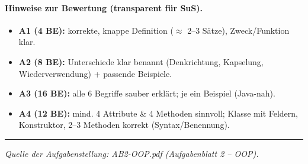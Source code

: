 \documentclass[11pt,a4paper]{scrartcl}
\begin{document}
	\paragraph{Hinweise zur Bewertung (transparent für SuS).}
	\begin{itemize}[leftmargin=*,itemsep=0.2em]
		\item \textbf{A1 (4 BE):} korrekte, knappe Definition (\(\approx\) 2–3 Sätze), Zweck/Funktion klar.
		\item \textbf{A2 (8 BE):} Unterschiede klar benannt (Denkrichtung, Kapselung, Wiederverwendung) + passende Beispiele.
		\item \textbf{A3 (16 BE):} alle 6 Begriffe sauber erklärt; je ein Beispiel (Java-nah).
		\item \textbf{A4 (12 BE):} mind. 4 Attribute \& 4 Methoden sinnvoll; Klasse mit Feldern, Konstruktor, 2–3 Methoden korrekt (Syntax/Benennung).
	\end{itemize}
	
	\vfill
	\hrule
	\small\emph{Quelle der Aufgabenstellung: AB2-OOP.pdf (Aufgabenblatt 2 – OOP).}
\end{document}
